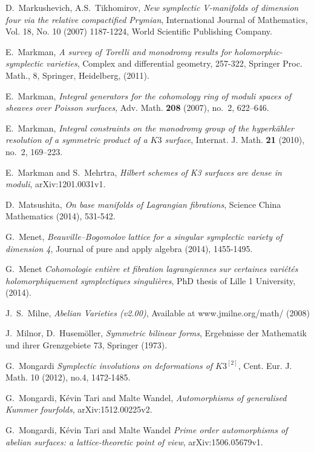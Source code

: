 \begin{thebibliography}{10}
D.~Markushevich, A.S.~Tikhomirov,
\emph{ New symplectic V-manifolds of dimension four via the relative compactified Prymian},
International Journal of Mathematics, Vol. 18, No. 10 (2007) 1187-1224,
World Scientific Publishing Company.  
  
E.~Markman,
\emph{ A survey of Torelli and monodromy results for holomorphic-symplectic varieties},
Complex and differential geometry,
257-322, Springer Proc. Math., 8, Springer, Heidelberg, (2011).  
  
E.~Markman, \emph{Integral generators for the cohomology ring of moduli spaces of
  sheaves over Poisson surfaces}, Adv. Math. \textbf{208} (2007), no.~2,
  622--646.

E.~Markman, \emph{Integral constraints on the monodromy group of the
  hyperk\"ahler resolution of a symmetric product of a {$K3$} surface},
  Internat. J. Math. \textbf{21} (2010), no.~2, 169--223.

E.~Markman and S.~Mehrtra,
\emph{Hilbert schemes of K3 surfaces are dense in moduli},
arXiv:1201.0031v1.

D.~Matsushita,
\emph{On base manifolds of Lagrangian fibrations},
Science China Mathematics (2014), 531-542.

G.~Menet,
\emph{Beauville--Bogomolov lattice for a singular symplectic variety of dimension 4},
Journal of pure and apply algebra (2014), 1455-1495.

G.~Menet
\emph{Cohomologie enti\`ere et fibration lagrangiennes sur certaines vari\'et\'es holomorphiquement symplectiques singuli\`eres},
PhD thesis of Lille 1 University, (2014).

J.~S.~Milne, \emph{Abelian Varieties (v2.00)}, Available at www.jmilne.org/math/ (2008)  

J.~Milnor, D.~Husem\"oller, \emph{Symmetric bilinear forms}, Ergebnisse der Mathematik
  und ihrer Grenzgebiete 73, Springer (1973).

G.~Mongardi
\emph{Symplectic involutions on deformations of $K3^{[2]}$},
Cent. Eur. J. Math. 
10 (2012), no.4, 1472-1485.

G.~Mongardi, K\'evin Tari and Malte Wandel,
\emph{Automorphisms of generalised Kummer fourfolds},
arXiv:1512.00225v2. 

G.~Mongardi, K\'evin Tari and Malte Wandel
\emph{Prime order automorphisms of abelian surfaces: a lattice-theoretic point of view},
arXiv:1506.05679v1. 


\end{thebibliography}
